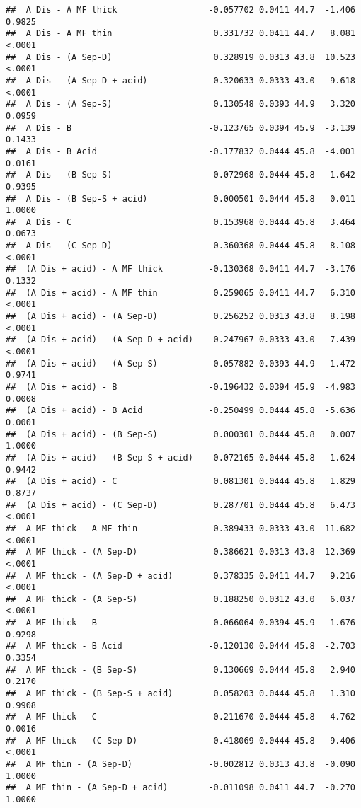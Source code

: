\documentclass[
]{article}
\begin{document}
\begin{verbatim}
##  A Dis - A MF thick                  -0.057702 0.0411 44.7  -1.406  0.9825
##  A Dis - A MF thin                    0.331732 0.0411 44.7   8.081  <.0001
##  A Dis - (A Sep-D)                    0.328919 0.0313 43.8  10.523  <.0001
##  A Dis - (A Sep-D + acid)             0.320633 0.0333 43.0   9.618  <.0001
##  A Dis - (A Sep-S)                    0.130548 0.0393 44.9   3.320  0.0959
##  A Dis - B                           -0.123765 0.0394 45.9  -3.139  0.1433
##  A Dis - B Acid                      -0.177832 0.0444 45.8  -4.001  0.0161
##  A Dis - (B Sep-S)                    0.072968 0.0444 45.8   1.642  0.9395
##  A Dis - (B Sep-S + acid)             0.000501 0.0444 45.8   0.011  1.0000
##  A Dis - C                            0.153968 0.0444 45.8   3.464  0.0673
##  A Dis - (C Sep-D)                    0.360368 0.0444 45.8   8.108  <.0001
##  (A Dis + acid) - A MF thick         -0.130368 0.0411 44.7  -3.176  0.1332
##  (A Dis + acid) - A MF thin           0.259065 0.0411 44.7   6.310  <.0001
##  (A Dis + acid) - (A Sep-D)           0.256252 0.0313 43.8   8.198  <.0001
##  (A Dis + acid) - (A Sep-D + acid)    0.247967 0.0333 43.0   7.439  <.0001
##  (A Dis + acid) - (A Sep-S)           0.057882 0.0393 44.9   1.472  0.9741
##  (A Dis + acid) - B                  -0.196432 0.0394 45.9  -4.983  0.0008
##  (A Dis + acid) - B Acid             -0.250499 0.0444 45.8  -5.636  0.0001
##  (A Dis + acid) - (B Sep-S)           0.000301 0.0444 45.8   0.007  1.0000
##  (A Dis + acid) - (B Sep-S + acid)   -0.072165 0.0444 45.8  -1.624  0.9442
##  (A Dis + acid) - C                   0.081301 0.0444 45.8   1.829  0.8737
##  (A Dis + acid) - (C Sep-D)           0.287701 0.0444 45.8   6.473  <.0001
##  A MF thick - A MF thin               0.389433 0.0333 43.0  11.682  <.0001
##  A MF thick - (A Sep-D)               0.386621 0.0313 43.8  12.369  <.0001
##  A MF thick - (A Sep-D + acid)        0.378335 0.0411 44.7   9.216  <.0001
##  A MF thick - (A Sep-S)               0.188250 0.0312 43.0   6.037  <.0001
##  A MF thick - B                      -0.066064 0.0394 45.9  -1.676  0.9298
##  A MF thick - B Acid                 -0.120130 0.0444 45.8  -2.703  0.3354
##  A MF thick - (B Sep-S)               0.130669 0.0444 45.8   2.940  0.2170
##  A MF thick - (B Sep-S + acid)        0.058203 0.0444 45.8   1.310  0.9908
##  A MF thick - C                       0.211670 0.0444 45.8   4.762  0.0016
##  A MF thick - (C Sep-D)               0.418069 0.0444 45.8   9.406  <.0001
##  A MF thin - (A Sep-D)               -0.002812 0.0313 43.8  -0.090  1.0000
##  A MF thin - (A Sep-D + acid)        -0.011098 0.0411 44.7  -0.270  1.0000

\end{verbatim}
\end{document}
